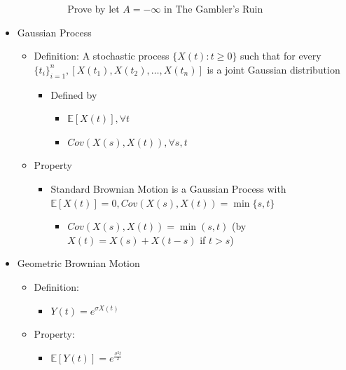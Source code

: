 \documentclass[a4paper]{article}
\begin{document}
\begin{itemize}
\begin{itemize}
\begin{itemize}
\begin{itemize}
                                    Prove by let $A = -\infty$ in The Gambler's Ruin
                            \end{itemize}
                \end{itemize}
        \end{itemize}
    \item Gaussian Process
        \begin{itemize}
            \item Definition: A stochastic process $\{X(t): t \geq 0\}$ such that for every $\{t_i\}_{i=1}^n, [X(t_1), X(t_2), \dots, X(t_n)]$ is a joint Gaussian distribution
                \begin{itemize}
                    \item Defined by
                        \begin{itemize}
                            \item $\mathbb{E}[X(t)], \forall t$
                            \item $\mathit{Cov}(X(s), X(t)), \forall s, t$
                        \end{itemize}
                \end{itemize}
            \item Property
                \begin{itemize}
                    \item Standard Brownian Motion is a Gaussian Process with $\mathbb{E}[X(t)] = 0, \mathit{Cov}(X(s), X(t)) = \min\{s, t\}$
                        \begin{itemize}
                            \item $\mathit{Cov}(X(s), X(t)) = \min(s, t)$ (by $X(t) = X(s) + X(t-s)$ if $t > s$)
                        \end{itemize}
                \end{itemize}
        \end{itemize}
    \item Geometric Brownian Motion
        \begin{itemize}
            \item Definition:
                \begin{itemize}
                    \item $Y(t) = e^{\sigma X(t)}$
                \end{itemize}
            \item Property:
                \begin{itemize}
                    \item $\mathbb{E}[Y(t)] = e^{\frac{\sigma^2 t}{2}}$

\end{itemize}
\end{itemize}
\end{itemize}
\end{document}
